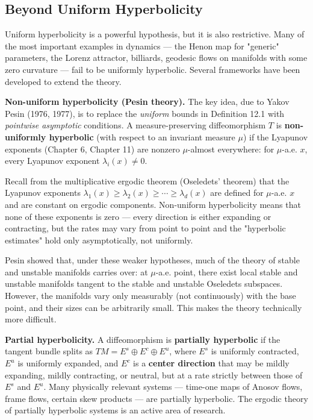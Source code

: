 \subsection{Beyond Uniform Hyperbolicity}\label{sec:12.2.4}

Uniform hyperbolicity is a powerful hypothesis, but it is also restrictive. Many of the most important examples in dynamics --- the Henon map for "generic" parameters, the Lorenz attractor, billiards, geodesic flows on manifolds with some zero curvature --- fail to be uniformly hyperbolic. Several frameworks have been developed to extend the theory.

\textbf{Non-uniform hyperbolicity (Pesin theory).} The key idea, due to Yakov Pesin (1976, 1977), is to replace the \textit{uniform} bounds in Definition 12.1 with \textit{pointwise asymptotic} conditions. A measure-preserving diffeomorphism $T$ is \textbf{non-uniformly hyperbolic} (with respect to an invariant measure $\mu$) if the Lyapunov exponents (Chapter 6, Chapter 11) are nonzero $\mu$-almost everywhere: for $\mu$-a.e. $x$, every Lyapunov exponent $\lambda_i(x) \neq 0$.

Recall from the multiplicative ergodic theorem (Oseledets' theorem) that the Lyapunov exponents $\lambda_1(x) \geq \lambda_2(x) \geq \cdots \geq \lambda_d(x)$ are defined for $\mu$-a.e. $x$ and are constant on ergodic components. Non-uniform hyperbolicity means that none of these exponents is zero --- every direction is either expanding or contracting, but the rates may vary from point to point and the "hyperbolic estimates" hold only asymptotically, not uniformly.

Pesin showed that, under these weaker hypotheses, much of the theory of stable and unstable manifolds carries over: at $\mu$-a.e. point, there exist local stable and unstable manifolds tangent to the stable and unstable Oseledets subspaces. However, the manifolds vary only measurably (not continuously) with the base point, and their sizes can be arbitrarily small. This makes the theory technically more difficult.

\textbf{Partial hyperbolicity.} A diffeomorphism is \textbf{partially hyperbolic} if the tangent bundle splits as $TM = E^s \oplus E^c \oplus E^u$, where $E^s$ is uniformly contracted, $E^u$ is uniformly expanded, and $E^c$ is a \textbf{center direction} that may be mildly expanding, mildly contracting, or neutral, but at a rate strictly between those of $E^s$ and $E^u$. Many physically relevant systems --- time-one maps of Anosov flows, frame flows, certain skew products --- are partially hyperbolic. The ergodic theory of partially hyperbolic systems is an active area of research.

